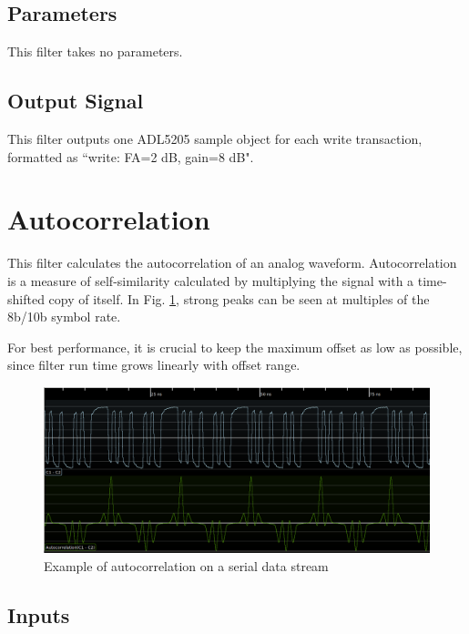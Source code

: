 \subsection{Parameters}

This filter takes no parameters.

\subsection{Output Signal}

This filter outputs one ADL5205 sample object for each write transaction, formatted as ``write: FA=2 dB, gain=8 dB".

\pagebreak
\section{Autocorrelation}
\label{filter:autocorrelation}

This filter calculates the autocorrelation of an analog waveform. Autocorrelation is a measure of self-similarity
calculated by multiplying the signal with a time-shifted copy of itself. In Fig. \ref{filter_accouple}, strong peaks
can be seen at multiples of the 8b/10b symbol rate.

For best performance, it is crucial to keep the maximum offset as low as possible, since filter run time grows linearly
with offset range.

\begin{figure}[h]
\centering
\includegraphics[width=16cm]{images/filters/autocorrelation.png}
\caption{Example of autocorrelation on a serial data stream}
\label{filter_accouple}
\end{figure}

\subsection{Inputs}

